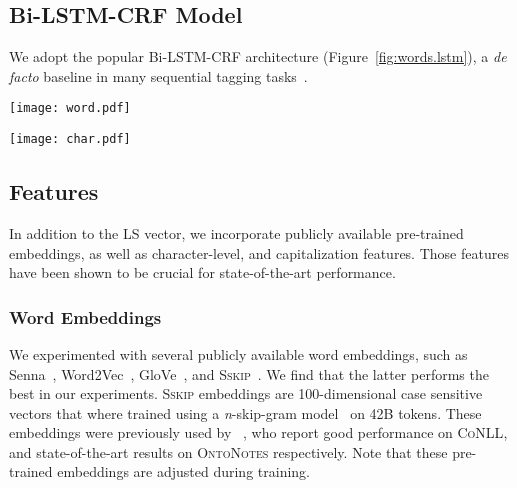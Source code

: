 \documentclass[11pt]{article}
\newcommand{\conll}{\textsc{CoNLL}}
\newcommand{\onto}{\textsc{OntoNotes}}
\newcommand{\sskip}{\textsc{Sskip}}
\newcommand{\lr}{\textsc{LS}}
\begin{document}
	\subsection{Bi-LSTM-CRF Model}
	\label{sec:Bi-LSTM-CRF Model}
	
	
	We adopt the popular Bi-LSTM-CRF architecture (Figure~\ref{fig:words.lstm}), a \textit{de facto} baseline in many sequential tagging tasks~\cite{lample2016neural,sogaard2016deep,chiu2015named}. 

	
	\begin{figure*}[hbt]
		\hspace*{-4mm}
		
		\begin{minipage}[c]{0.5\linewidth}
			\hspace{1cm} \texttt{[image: word.pdf]}
		\end{minipage}
\begin{minipage}[c]{0.5\linewidth}
			\texttt{[image: char.pdf]}
		\end{minipage}
		
		\caption{\textbf{Left Figure:} Main architecture of our NER system. \textbf{Right Figure:} Character representation of the word \enquote{Roma} given to the word-level bi-LSTM.}
		
		\label{fig:words.lstm}
		
	\end{figure*} 
	
	
	\subsection{Features}
	
	In addition to the \lr{} vector, we incorporate publicly available pre-trained embeddings, as well as character-level, and capitalization features. Those features have been shown to be crucial for state-of-the-art performance. 
	
	\subsubsection{Word Embeddings}
	\label{sec:pretrained}
	We experimented with several publicly available word embeddings, such as Senna~\cite{collobert2011natural}, Word2Vec~\cite{mikolov2013distributed}, GloVe~\cite{pennington2014glove}, and \sskip~\cite{yulia2015not}. We find that the latter  performs the best in our experiments. \sskip{} embeddings  are 100-dimensional case sensitive vectors that where trained using a \textit{n}-skip-gram model~\cite{yulia2015not} on 42B tokens. These embeddings were previously used by ~\cite{lample2016neural,strubell2017fast}, who report good performance on \conll{}, and state-of-the-art results on \onto{} respectively. Note that these pre-trained embeddings are adjusted during training.
	
\end{document}
